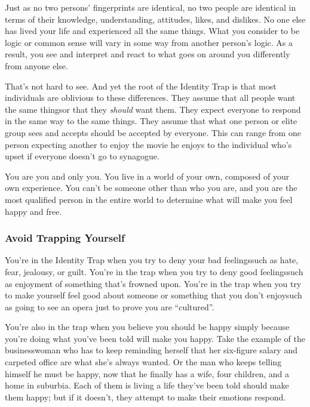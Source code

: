 {  \newReading Just as no two persons' fingerprints are identical, no two people
  are identical in terms of their knowledge, understanding, attitudes, likes,
  and dislikes. No one else has lived your life and experienced all the same
  things. What you consider to be logic or common sense will vary in some way
  from another person's logic. As a result, you see and interpret and react to
  what goes on around you differently from anyone else.

  That's not hard to see. And yet the root of the Identity Trap is that most
  individuals are oblivious to these differences. They assume that all people
  want the same things\textemdash{}or that they \textit{should} want them. They
  expect everyone to respond in the same way to the same things. They assume
  that what one person or elite group sees and accepts should be accepted by
  everyone. This can range from one person expecting another to enjoy the movie
  he enjoys to the individual who's upset if everyone doesn't go to synagogue.

  You are you and only you. You live in a world of your own, composed of your
  own experience. You can't be someone other than who you are, and you are the
  most qualified person in the entire world to determine what will make you feel
  happy and free.

  \subsubsection*{Avoid Trapping Yourself}
  \newReading You’re in the Identity Trap when you try to deny your bad
  feelings\textemdash{}such as hate, fear, jealousy, or guilt. You're in the
  trap when you try to deny good feelings\textemdash{}such as enjoyment of
  something that's frowned upon. You're in the trap when you try to make
  yourself feel good about someone or something that you don't
  enjoy\textemdash{}such as going to see an opera just to prove you are
  ``cultured''.

  You're also in the trap when you believe you should be happy simply because
  you're doing what you've been told will make you happy. Take the example of
  the businesswoman who has to keep reminding herself that her six-figure salary
  and carpeted office are what she's always wanted. Or the man who keeps telling
  himself he must be happy, now that he finally has a wife, four children, and a
  home in suburbia. Each of them is living a life they've been told should make
  them happy; but if it doesn't, they attempt to make their emotions respond.

}
